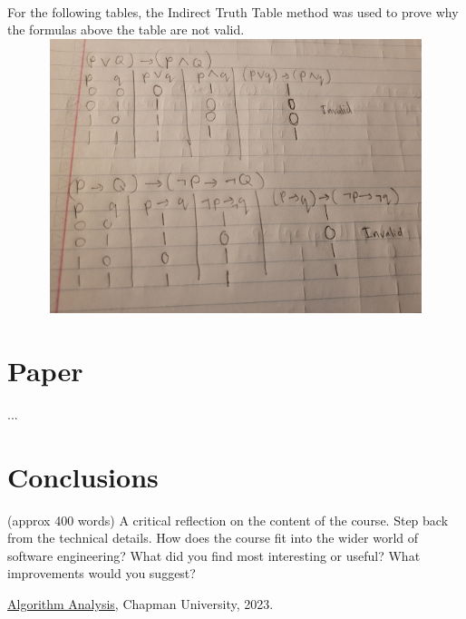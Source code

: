 \documentclass{article}
\theoremstyle{theorem}
\theoremstyle{definition}
\theoremstyle{remark}
\begin{document}
\\
For the following tables, the Indirect Truth Table method was used to prove why the formulas above the table are not valid.
\\ \includegraphics[width=15cm, height=8cm]{Report Images/HW6_4.jpg}
\section{Paper}

...

\section{Conclusions}\label{conclusions}

(approx 400 words) A critical reflection on the content of the course. Step back from the technical details. How does the course fit into the wider world of software engineering? What did you find most interesting or useful? What improvements would you suggest?

\begin{thebibliography}{99}
 \href{https://github.com/alexhkurz/algorithm-analysis-2023}{Algorithm Analysis}, Chapman University, 2023.
\end{thebibliography}
\end{document}
